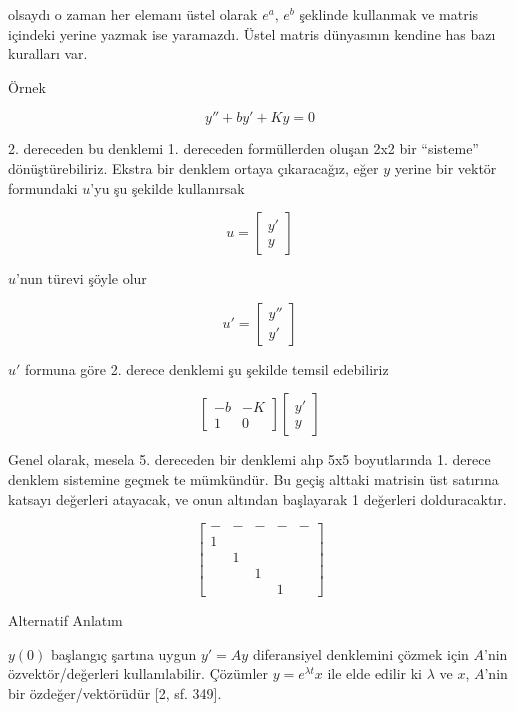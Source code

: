 \documentclass[12pt,fleqn]{article}\usepackage{../../common}
\begin{document}
olsaydı o zaman her elemanı üstel olarak $e^{a}$, $e^b$ şeklinde kullanmak
ve matris içindeki yerine yazmak ise yaramazdı. Üstel matris dünyasının
kendine has bazı kuralları var.

Örnek

$$ y'' + by' + Ky = 0 $$

2. dereceden bu denklemi 1. dereceden formüllerden oluşan 2x2 bir
``sisteme'' dönüştürebiliriz. Ekstra bir denklem ortaya çıkaracağız, eğer
$y$ yerine bir vektör formundaki $u$'yu şu şekilde kullanırsak

$$ u = 
\left[\begin{array}{c}
y' \\ y
\end{array}\right]
 $$

$u$'nun türevi şöyle olur

$$ 
u' = 
\left[\begin{array}{c}
y'' \\ y'
\end{array}\right]
 $$

$u'$ formuna göre 2. derece denklemi şu şekilde temsil edebiliriz

$$ 
\left[\begin{array}{cc}
-b & -K \\
1 & 0
\end{array}\right]
\left[\begin{array}{c}
y' \\ y
\end{array}\right]
 $$

Genel olarak, mesela 5. dereceden bir denklemi alıp 5x5 boyutlarında 1. 
derece denklem sistemine geçmek te mümkündür. Bu geçiş alttaki matrisin 
üst satırına katsayı değerleri atayacak, ve onun altından başlayarak 1 
değerleri dolduracaktır. 

$$ 
\left[\begin{array}{rrrrr}
- & - & - & - & - \\
1 &&&& \\
& 1 &&& \\
&& 1 && \\
&&& 1 & 
\end{array}\right]
 $$

Alternatif Anlatım

$y(0)$ başlangıç şartına uygun $y' = Ay$ diferansiyel denklemini çözmek için
$A$'nin özvektör/değerleri kullanılabilir. Çözümler $y = e^{\lambda t} x$ ile
elde edilir ki $\lambda$ ve $x$, $A$'nin bir özdeğer/vektörüdür [2, sf. 349].
\end{document}
